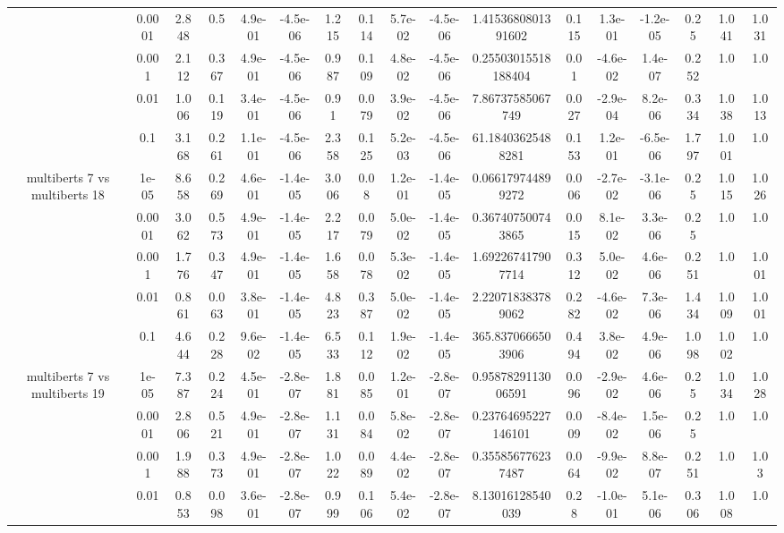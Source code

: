 \begin{tabular}{|c|c|c|c|c|c|c|c|c|c|c|c|c|c|c|c|c|}
 & 0.0001 & 2.848 & 0.5 & 4.9e-01 & -4.5e-06 & 1.215 & 0.114 & 5.7e-02 & -4.5e-06 & 1.4153680801391602 & 0.115 & 1.3e-01 & -1.2e-05 & 0.25 & 1.041 & 1.031 \\
 & 0.001 & 2.112 & 0.367 & 4.9e-01 & -4.5e-06 & 0.987 & 0.109 & 4.8e-02 & -4.5e-06 & 0.25503015518188404 & 0.01 & -4.6e-02 & 1.4e-07 & 0.252 & 1.0 & 1.0 \\
 & 0.01 & 1.006 & 0.119 & 3.4e-01 & -4.5e-06 & 0.91 & 0.079 & 3.9e-02 & -4.5e-06 & 7.86737585067749 & 0.027 & -2.9e-04 & 8.2e-06 & 0.334 & 1.038 & 1.013 \\
 & 0.1 & 3.168 & 0.261 & 1.1e-01 & -4.5e-06 & 2.358 & 0.125 & 5.2e-03 & -4.5e-06 & 61.18403625488281 & 0.153 & 1.2e-01 & -6.5e-06 & 1.797 & 1.001 & 1.0 \\
\hline
\multirow{5}{*}{multiberts 7 vs multiberts 18} & 1e-05 & 8.658 & 0.269 & 4.6e-01 & -1.4e-05 & 3.006 & 0.08 & 1.2e-01 & -1.4e-05 & 0.066179744899272 & 0.006 & -2.7e-02 & -3.1e-06 & 0.25 & 1.015 & 1.026 \\
 & 0.0001 & 3.062 & 0.573 & 4.9e-01 & -1.4e-05 & 2.217 & 0.079 & 5.0e-02 & -1.4e-05 & 0.367407500743865 & 0.015 & 8.1e-02 & 3.3e-06 & 0.25 & 1.0 & 1.0 \\
 & 0.001 & 1.776 & 0.347 & 4.9e-01 & -1.4e-05 & 1.658 & 0.078 & 5.3e-02 & -1.4e-05 & 1.692267417907714 & 0.312 & 5.0e-02 & 4.6e-06 & 0.251 & 1.0 & 1.001 \\
 & 0.01 & 0.861 & 0.063 & 3.8e-01 & -1.4e-05 & 4.823 & 0.387 & 5.0e-02 & -1.4e-05 & 2.220718383789062 & 0.282 & -4.6e-02 & 7.3e-06 & 1.434 & 1.009 & 1.001 \\
 & 0.1 & 4.644 & 0.228 & 9.6e-02 & -1.4e-05 & 6.533 & 0.112 & 1.9e-02 & -1.4e-05 & 365.8370666503906 & 0.494 & 3.8e-02 & 4.9e-06 & 1.098 & 1.002 & 1.0 \\
\hline
\multirow{5}{*}{multiberts 7 vs multiberts 19} & 1e-05 & 7.387 & 0.224 & 4.5e-01 & -2.8e-07 & 1.881 & 0.085 & 1.2e-01 & -2.8e-07 & 0.9587829113006591 & 0.096 & -2.9e-02 & 4.6e-06 & 0.25 & 1.034 & 1.028 \\
 & 0.0001 & 2.806 & 0.521 & 4.9e-01 & -2.8e-07 & 1.131 & 0.084 & 5.8e-02 & -2.8e-07 & 0.23764695227146101 & 0.009 & -8.4e-02 & 1.5e-06 & 0.25 & 1.0 & 1.0 \\
 & 0.001 & 1.988 & 0.373 & 4.9e-01 & -2.8e-07 & 1.022 & 0.089 & 4.4e-02 & -2.8e-07 & 0.355856776237487 & 0.064 & -9.9e-02 & 8.8e-07 & 0.251 & 1.0 & 1.03 \\
 & 0.01 & 0.853 & 0.098 & 3.6e-01 & -2.8e-07 & 0.999 & 0.106 & 5.4e-02 & -2.8e-07 & 8.13016128540039 & 0.28 & -1.0e-01 & 5.1e-06 & 0.306 & 1.008 & 1.0 \\

\end{tabular}
